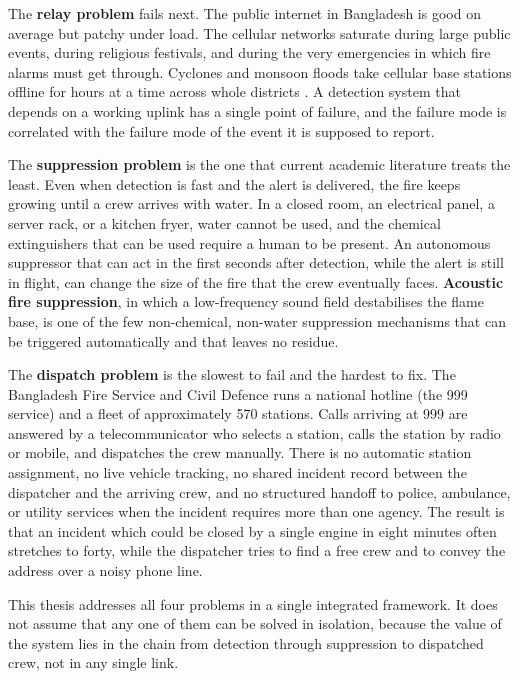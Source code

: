 The \textbf{relay problem} fails next. The public internet in Bangladesh is good on average but patchy under load. The cellular networks saturate during large public events, during religious festivals, and during the very emergencies in which fire alarms must get through. Cyclones and monsoon floods take cellular base stations offline for hours at a time across whole districts \cite{gsma2023disaster}. A detection system that depends on a working uplink has a single point of failure, and the failure mode is correlated with the failure mode of the event it is supposed to report.

The \textbf{suppression problem} is the one that current academic literature treats the least. Even when detection is fast and the alert is delivered, the fire keeps growing until a crew arrives with water. In a closed room, an electrical panel, a server rack, or a kitchen fryer, water cannot be used, and the chemical extinguishers that can be used require a human to be present. An autonomous suppressor that can act in the first seconds after detection, while the alert is still in flight, can change the size of the fire that the crew eventually faces. \textbf{Acoustic fire suppression}, in which a low-frequency sound field destabilises the flame base, is one of the few non-chemical, non-water suppression mechanisms that can be triggered automatically and that leaves no residue.

The \textbf{dispatch problem} is the slowest to fail and the hardest to fix. The Bangladesh Fire Service and Civil Defence runs a national hotline (the 999 service) and a fleet of approximately 570 stations. Calls arriving at 999 are answered by a telecommunicator who selects a station, calls the station by radio or mobile, and dispatches the crew manually. There is no automatic station assignment, no live vehicle tracking, no shared incident record between the dispatcher and the arriving crew, and no structured handoff to police, ambulance, or utility services when the incident requires more than one agency. The result is that an incident which could be closed by a single engine in eight minutes often stretches to forty, while the dispatcher tries to find a free crew and to convey the address over a noisy phone line.

This thesis addresses all four problems in a single integrated framework. It does not assume that any one of them can be solved in isolation, because the value of the system lies in the chain from detection through suppression to dispatched crew, not in any single link.

